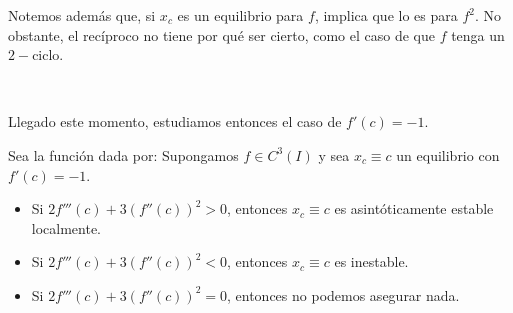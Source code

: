 \begin{observacion}
    Notemos además que, si $x_c$ es un equilibrio para $f$, implica que lo es para $f^2$. No obstante, el recíproco no tiene por qué ser cierto, como el caso de que $f$ tenga un $2-$ciclo.
\end{observacion}

~\vspace{1cm}

Llegado este momento, estudiamos entonces el caso de $f'(c)=-1$.
\begin{prop}
    Sea la función dada por:
    Supongamos $f \in C^3 (I)$ y sea $x_c \equiv c$ un equilibrio con $f'(c)=-1$.
    \begin{itemize}
        \item Si $2f'''(c)+3(f''(c))^2 > 0$, entonces $x_c \equiv c$ es asintóticamente estable localmente.
        \item Si $2f'''(c)+3(f''(c))^2 < 0$, entonces $x_c \equiv c$ es inestable.
        \item Si $2f'''(c)+3(f''(c))^2 = 0$, entonces no podemos asegurar nada.
    \end{itemize}
\end{prop}
